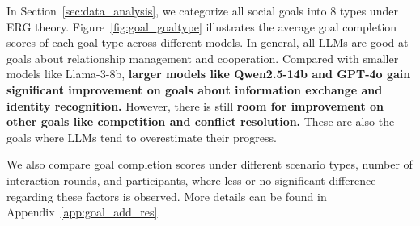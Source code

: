 In Section~\ref{sec:data_analysis}, we categorize all social goals into 8 types under ERG theory.
Figure~\ref{fig:goal_goaltype} illustrates the average goal completion scores of each goal type across different models.
In general, all LLMs are good at goals about relationship management and cooperation.
Compared with smaller models like Llama-3-8b, \textbf{larger models like Qwen2.5-14b and GPT-4o gain significant improvement on goals about information exchange and identity recognition.}
However, there is still \textbf{room for improvement on other goals like competition and conflict resolution.}
These are also the goals where LLMs tend to overestimate their progress.

We also compare goal completion scores under different scenario types, number of interaction rounds, and participants, where less or no significant difference regarding these factors is observed.
More details can be found in Appendix~\ref{app:goal_add_res}.

